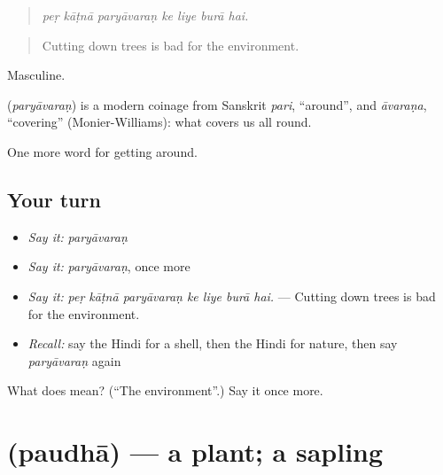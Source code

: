 \begin{quote}
      
\end{quote}

\begin{quote}
\emph{peṛ kāṭnā paryāvaraṇ ke liye burā hai.}
\end{quote}

\begin{quote}
Cutting down trees is bad for the environment.
\end{quote}

Masculine.

\begin{cousinweb}
\textbf{} (\emph{paryāvaraṇ}) is a modern coinage from Sanskrit \emph{pari}, \textquotedblleft{}around\textquotedblright{}, and \emph{āvaraṇa}, \textquotedblleft{}covering\textquotedblright{} (Monier-Williams): what covers us all round.
\end{cousinweb}

\begin{grammarlens}[title={What you've built}]
One more word for getting around.
\end{grammarlens}

\subsection*{Your turn}
\begin{itemize}
\raggedright
  \item \emph{Say it:} \emph{paryāvaraṇ}
  \item \emph{Say it:} \emph{paryāvaraṇ}, once more
  \item \emph{Say it:} \emph{peṛ kāṭnā paryāvaraṇ ke liye burā hai.} — Cutting down trees is bad for the environment.
  \item \emph{Recall:} say the Hindi for a shell, then the Hindi for nature, then say \emph{paryāvaraṇ} again
\end{itemize}

\begin{tcolorbox}[breakable,colback=teal!4,colframe=teal!35!black,title={Before you move on}]
What does  mean? (\textquotedblleft{}The environment\textquotedblright{}.) Say it once more.
\end{tcolorbox}
\section[\texorpdfstring{\hi{पौधा} (paudhā)}{पौधा (paudhā)}]{ (paudhā) — a plant; a sapling}

